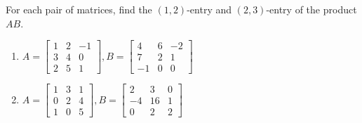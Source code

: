 \documentclass{ximera}
\begin{document}
\begin{problem}\label{prb:4.25} For each pair of matrices, find the $(1,2)$-entry and $(2,3)$-entry of the product $AB$.
\begin{enumerate}
\item
$A = \left[ \begin{array}{rrr}
1 & 2 & -1 \\
3 & 4 & 0 \\
2 & 5 & 1
\end{array} \right], B = \left[ \begin{array}{rrr}
4 & 6 & -2 \\
7 & 2 & 1 \\
-1 & 0 & 0
\end{array} \right]$
\item
$A = \left[ \begin{array}{rrr}
1 & 3 & 1 \\
0 & 2 & 4 \\
1 & 0 & 5
\end{array} \right], B = \left[ \begin{array}{rrr}
2 & 3 & 0 \\
-4 & 16 & 1 \\
0 & 2 & 2
\end{array} \right]$
\end{enumerate}
\end{problem}
\end{document}
